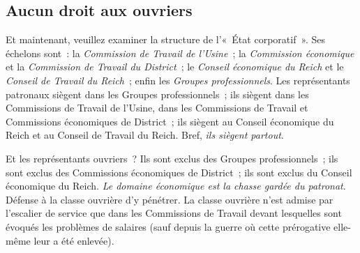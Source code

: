 \documentclass[french,twoside]{book} %
\begin{document}
\subsection[Aucun droit aux ouvriers]{Aucun droit aux ouvriers}
\noindent Et maintenant, veuillez examiner la structure de l’« État corporatif ». Ses échelons sont : la \emph{Commission de Travail de l’Usine} ; la \emph{Commission économique} et la \emph{Commission de Travail du District} ; le \emph{Conseil économique du Reich} et le \emph{Conseil de Travail du Reich} ; enfin les \emph{Groupes professionnels}. Les représentants patronaux siègent dans les Groupes professionnels ; ils siègent dans les Commissions de Travail de l’Usine, dans les Commissions de Travail et Commissions économiques de District ; ils siègent au Conseil économique du Reich et au Conseil de Travail du Reich. Bref, \emph{ils siègent partout}.\par
Et les représentants ouvriers ? Ils sont exclus des Groupes professionnels ; ils sont exclus des Commissions économiques de District ; ils sont exclus du Conseil économique du Reich. \emph{Le domaine économique est la chasse gardée du patronat}. Défense à la classe ouvrière d’y pénétrer. La classe ouvrière n’est admise par l’escalier de service que dans les Commissions de Travail devant lesquelles sont évoqués les problèmes de salaires (sauf depuis la guerre où cette prérogative elle-même leur a été enlevée).
\end{document}
